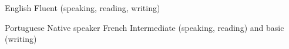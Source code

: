 

\begin{cvskills}

  \cvskill
    {English} %
    {Fluent (speaking, reading, writing)} %

  \cvskill
    {Portuguese} %
    {Native speaker} %
  \cvskill
    {French} %
    {Intermediate (speaking, reading) and basic (writing)} %
\end{cvskills}